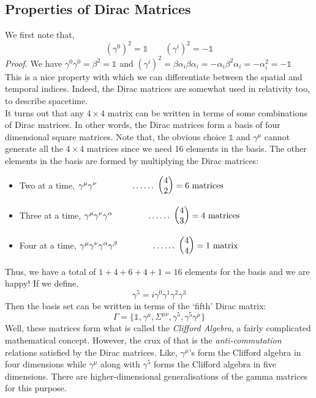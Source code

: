 \subsection{Properties of Dirac Matrices}
We first note that, 
$$(\gamma^0)^2 =\mathds{1}\qquad (\gamma^i)^2 =-\mathds{1}$$
\textit{Proof.} We have $\gamma^0\gamma^0 = \beta^2 = \mathds{1}$ and $(\gamma^i)^2  = \beta \alpha_i \beta \alpha_i = - \alpha_i \beta^2 \alpha_i = -\alpha_i^2 = -\mathds{1}$\\[0.2cm]
This is a nice property with which we can differentiate between the spatial and temporal indices. Indeed, the Dirac matrices are somewhat used in relativity too, to describe spacetime.\\[0.2cm]
It turns out that any $4\times 4$ matrix can be written in terms of some combinations of Dirac matrices. In other words, the Dirac matrices form a basis of four dimensional square matrices. Note that, the obvious choice $\mathds{1}$ and $\gamma^\mu$ cannot generate all the $4\times 4$ matrices since we need 16 elements in the basis. The other elements in the basis are formed by multiplying the Dirac matrices:
\begin{itemize}
    \item Two at a time, $\gamma^{\mu}\gamma^{\nu}\qquad\qquad\hfill \ldots\ldots\ \mqty(4\\2) = 6 \ \mathrm{matrices}$ 
    \item Three at a time, $\gamma^{\mu}\gamma^{\nu}\gamma^{\alpha}\qquad\qquad\hfill\ldots\ldots\ \mqty(4\\3) = 4 \ \mathrm{matrices}$
    \item Four at a time, $\gamma^{\mu}\gamma^{\nu}\gamma^{\alpha}\gamma^{\beta}\qquad\qquad\hfill\ldots\ldots\ \mqty(4\\4) = 1 \ \mathrm{matrix}$
\end{itemize}
Thus, we have a total of $1+4+6+4+1=16$ elements for the basis and we are happy! If we define,
$$\gamma^5 = i\gamma^{0}\gamma^{1}\gamma^{2}\gamma^{3}$$
Then the basis set can be written in terms of the `fifth' Dirac matrix:
$$\Gamma = \{\mathds{1}, \gamma^\mu, \Sigma^{\mu\nu},\gamma^5, \gamma^5\gamma^\mu\}$$
Well, these matrices form what is called the \textit{Clifford Algebra}, a fairly complicated mathematical concept. However, the crux of that is the \textit{anti-commutation} relations satisfied by the Dirac matrices. Like, $\gamma^\mu$'s form the Clifford algebra in four dimensions while $\gamma^\mu$ along with $\gamma^5$ forms the Clifford algebra in five dimensions. There are higher-dimensional generalisations of the gamma matrices for this purpose. \\[0.2cm]
